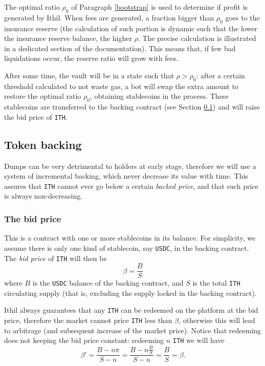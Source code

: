 \documentclass[a4paper,10 pt]{article}
\theoremstyle{definition}
\begin{document}
The optimal ratio $\rho_0$ of Paragraph \ref{bootstrap} is used to determine if profit is generated by Ithil. When fees are generated, a fraction bigger than $\rho_0$ goes to the insurance reserve (the calculation of such portion is dynamic such that the lower the insurance reserve balance, the higher $\rho$. The precise calculation is illustrated in a dedicated section of the documentation). This means that, if few bad liquidations occur, the reserve ratio will grow with fees.

After some time, the vault will be in a state such that $\rho > \rho_0$: after a certain threshold calculated to not waste gas, a bot will swap the extra amount to restore the optimal ratio $\rho_0$, obtaining stablecoins in the process. These stablecoins are transferred to the backing contract (see Section \ref{backing}) and will raise the bid price of \verb|ITH|.

\subsection{Token backing}\label{backing}

Dumps can be very detrimental to holders at early stage, therefore we will use a system of incremental backing, which never decrease its value with time. This assures that \verb|ITH| cannot ever go below a certain {\it backed price}, and that such price is always non-decreasing.

\subsubsection{The bid price}

This is a contract with one or more stablecoins in its balance. For simplicity, we assume there is only one kind of stablecoin, say \verb|USDC|, in the backing contract. The {\it bid price} of \verb|ITH| will then be
\begin{equation}\label{bid price}
\beta = \frac{B}{S}
\end{equation} 
where $B$ is the \verb|USDC| balance of the backing contract, and $S$ is the total \verb|ITH| circulating supply (that is, excluding the supply locked in the backing contract).

Ithil always guarantees that any \verb|ITH| can be redeemed on the platform at the bid price, therefore the market cannot price \verb|ITH| less than $\beta$, otherwise this will lead to arbitrage (and subsequent increase of the market price). Notice that redeeming does not  keeping the bid price constant: redeeming $n$ \verb|ITH| we will have
$$\beta' = \frac{B - n\pi}{S - n} = \frac{B - n\frac{B}{S}}{S-n} = \frac{B}{S} = \beta.$$
\end{document}
